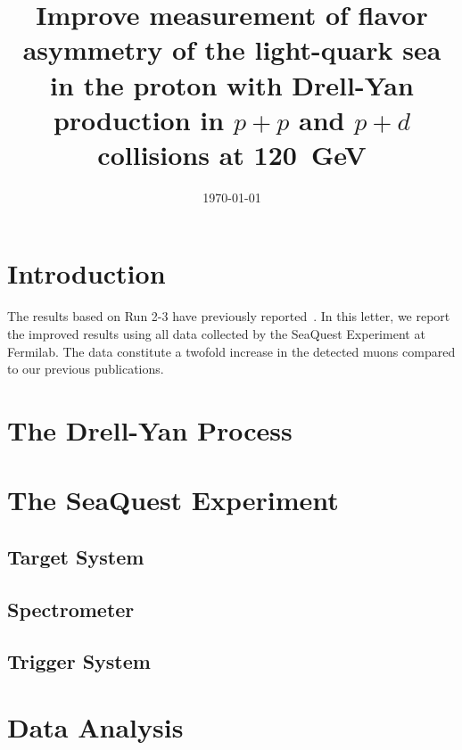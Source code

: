 \documentclass[reprint,aps,unsortedaddress,superscriptaddress,prd,floatfix,showpacs,linenumbers]{revtex4-2}
\begin{document}
\title{Improve measurement of flavor asymmetry of the light-quark sea in the proton with Drell-Yan production in
	\texorpdfstring{$p+p$}{p+p} and \texorpdfstring{$p+d$}{p+d} collisions at \texorpdfstring{\SI{120}{\GeV}}{120~GeV}}


\date{\today}

\begin{abstract}
\end{abstract}


\maketitle

\section{Introduction}

The results based on Run 2-3 have previously reported~\cite{dove2021,dove2023}. 
In this letter, we report the improved results using all data collected by the SeaQuest Experiment at Fermilab.
The data constitute a twofold increase in the detected muons compared to our previous publications.

\section{The Drell-Yan Process}

\section{The SeaQuest Experiment}
\subsection{Target System}
\subsection{Spectrometer}
\subsection{Trigger System}

\section{Data Analysis}
\end{document}
